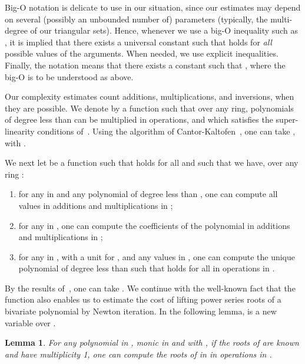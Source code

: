\documentclass[amsthm]{elsart}
\theoremstyle{plain}
\newtheorem{Lemma}{Lemma}
\begin{document}
Big-O notation is delicate to use in our situation, since our
estimates may depend on several (possibly an unbounded number of)
parameters (typically, the multi-degree of our triangular
sets). Hence, whenever we use a big-O inequality such as ,
it is implied that there exists a universal constant  such
that  holds for {\em
  all} possible values of the arguments. When needed, we use explicit
inequalities. Finally, the notation  means that
there exists a constant  such that , where the big-O is to be understood as above.

Our complexity estimates count additions, multiplications, and
inversions, when they are possible. We denote by  a
function such that over any ring, polynomials of degree less than 
can be multiplied in  operations, and which
satisfies the super-linearity conditions of~\cite[Chapter
8]{GaGe99}. Using the algorithm of Cantor-Kaltofen~\cite{CaKa91}, one
can take , with .

We next let  be a function such that 
holds for all  and such that we have, over any ring :
\begin{enumerate}
\item for any  in  and any polynomial  of degree less than , one can compute all values
   in  additions and multiplications in ;

\smallskip

\item for any  in , one can compute the
  coefficients of the polynomial  in 
  additions and multiplications in ;

\smallskip

\item for any  in , with  a unit for
  , and any values  in , one can compute
  the unique polynomial  of degree less than  such
  that  holds for all  in  operations in
  .
\end{enumerate}

\smallskip\noindent
By the results of~\cite[Chapter 10]{GaGe99}, one can take . We continue with the well-known fact that the function
 also enables us to estimate the cost of lifting power series
roots of a bivariate polynomial by Newton iteration. In the following
lemma,  is a new variable over .

\begin{Lemma}\label{lemma:lift}
  For any polynomial  in , monic in  and with
  , if the roots of  are known and have
  multiplicity 1, one can compute the roots of  in
   in 
  operations in .
\end{Lemma}
\end{document}
